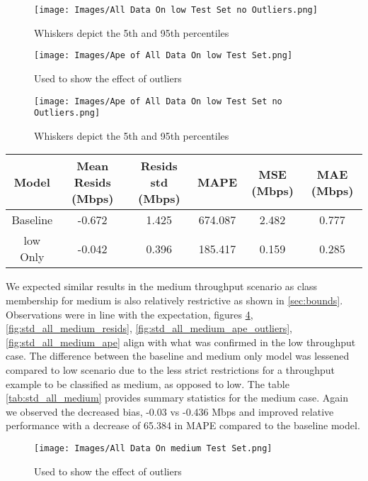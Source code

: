 \begin{figure}[H]
\texttt{[image: Images/All Data On low Test Set no Outliers.png]}
\centering
\caption{Whiskers depict the 5th and 95th percentiles}
\label{fig:std_all_low_resids}
\end{figure}

\begin{figure}[H]
\texttt{[image: Images/Ape of All Data On low Test Set.png]}
\centering
\caption{Used to show the effect of outliers}
\label{fig:std_all_low_ape_outliers}
\end{figure}

\begin{figure}[H]
\texttt{[image: Images/Ape of All Data On low Test Set no Outliers.png]}
\centering
\caption{Whiskers depict the 5th and 95th percentiles}
\label{fig:std_all_low_ape}
\end{figure}

\begin{table}[H]
\centering
\begin{tabular}{|c|c|c|c|c|c|}
\hline
{Model} & {Mean Resids (Mbps)} & {Resids std (Mbps)} & {MAPE} & {MSE (Mbps)} & {MAE (Mbps)}\\
\hline
Baseline & -0.672 & 1.425 & 674.087 & 2.482 & 0.777\\
\hline
low Only & -0.042 & 0.396 & 185.417 & 0.159 & 0.285\\
\hline
\end{tabular}
\label{tab:std_all_low}
\end{table}

\newpage
We expected similar results in the medium throughput scenario as class membership for medium is also relatively restrictive as shown in \ref{sec:bounds}. Observations were in line with the expectation, figures \ref{fig:std_all_medium_resids_outliers}, \ref{fig:std_all_medium_resids}, \ref{fig:std_all_medium_ape_outliers}, \ref{fig:std_all_medium_ape} align with what was confirmed in the low throughput case. The difference between the baseline and medium only model was lessened compared to low scenario due to the less strict restrictions for a throughput example to be classified as medium, as opposed to low. The table \ref{tab:std_all_medium} provides summary statistics for the medium case. Again we observed the decreased bias, -0.03 vs -0.436 Mbps and improved relative performance with a decrease of 65.384 in MAPE compared to the baseline model.

\begin{figure}[H]
\texttt{[image: Images/All Data On medium Test Set.png]}
\centering
\caption{Used to show the effect of outliers}
\label{fig:std_all_medium_resids_outliers}
\end{figure}

